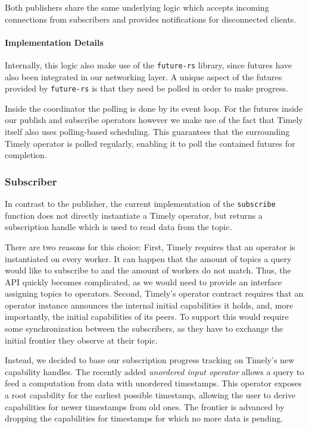 Both publishers share the same underlying logic which accepts incoming connections
from subscribers and provides notifications for disconnected clients.



\paragraph{Implementation Details}


Internally, this logic also make use of the \lstinline{future-rs} library, 
since futures have also been integrated in our networking layer. A unique
aspect of the futures provided by \lstinline{future-rs} is that they need
be polled in order to make progress.

Inside the coordinator the polling is done by its event loop. For the futures
inside our publish and subscribe operators however we make use of the fact
that Timely itself also uses polling-based scheduling. This guarantees that
the surrounding Timely operator is polled regularly, enabling it to poll
the contained futures for completion.

\subsubsection{Subscriber}

In contrast to the publisher, the current implementation of the \lstinline{subscribe}
function does not directly instantiate a Timely operator, but returns a subscription
handle which is used to read data from the topic.

There are two reasons for this choice: First, Timely requires that an operator
is instantiated on every worker. It can happen that the amount of topics a query
would like to subscribe to and the amount of workers do not match. Thus, the API
quickly becomes complicated, as we would need to provide an interface assigning
topics to operators.
Second, Timely's operator contract requires that an operator instance announces
the internal initial capabilities it holds, and, more importantly, the initial
capabilities of its peers. To support this would require some synchronization
between the subscribers, as they have to exchange the initial frontier they
observe at their topic.

Instead, we decided to base our subscription progress tracking on Timely's new
capability handles. The recently added \emph{unordered input operator} allows
a query to feed a computation from data with unordered timestamps. This operator
exposes a root capability for the earliest possible timestamp, allowing the user
to derive capabilities for newer timestamps from old ones. The frontier
is advanced by dropping the capabilities for timestamps for which no more data
is pending.

